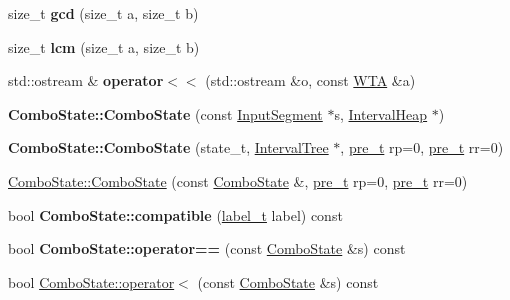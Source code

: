 \begin{DoxyCompactItemize}
size\+\_\+t {\bfseries gcd} (size\+\_\+t a, size\+\_\+t b)
\item 
\mbox{\label{group__schemata_ga21cc98547ba237fc676751c60c220415}} 
size\+\_\+t {\bfseries lcm} (size\+\_\+t a, size\+\_\+t b)
\item 
\mbox{\label{group__schemata_gab750ab8b8fe56baba66c96e38398b632}} 
std\+::ostream \& {\bfseries operator$<$$<$} (std\+::ostream \&o, const \mbox{\hyperlink{classWTA}{W\+TA}} \&a)
\item 
\mbox{\label{group__schemata_gadb95b4bb9322c3e2aba43ef1663a035e}} 
{\bfseries Combo\+State\+::\+Combo\+State} (const \mbox{\hyperlink{classInputSegment}{Input\+Segment}} $\ast$s, \mbox{\hyperlink{classIntervalHeap}{Interval\+Heap}} $\ast$)
\item 
\mbox{\label{group__schemata_gaffac6cd8adcfb6bbb0cd9fc601d9a2e1}} 
{\bfseries Combo\+State\+::\+Combo\+State} (state\+\_\+t, \mbox{\hyperlink{classIntervalTree}{Interval\+Tree}} $\ast$, \mbox{\hyperlink{group__general_ga092fe8b972dfa977c2a0886720a7731e}{pre\+\_\+t}} rp=0, \mbox{\hyperlink{group__general_ga092fe8b972dfa977c2a0886720a7731e}{pre\+\_\+t}} rr=0)
\item 
\mbox{\hyperlink{group__schemata_gad80378e34fdc145bd7f0dac17c306e39}{Combo\+State\+::\+Combo\+State}} (const \mbox{\hyperlink{classComboState}{Combo\+State}} \&, \mbox{\hyperlink{group__general_ga092fe8b972dfa977c2a0886720a7731e}{pre\+\_\+t}} rp=0, \mbox{\hyperlink{group__general_ga092fe8b972dfa977c2a0886720a7731e}{pre\+\_\+t}} rr=0)
\item 
\mbox{\label{group__schemata_ga946acbddc843e4ade0b1f47bca5b0929}} 
bool {\bfseries Combo\+State\+::compatible} (\mbox{\hyperlink{group__output_ga22fde970e635fcf63962743b2d5c441d}{label\+\_\+t}} label) const
\item 
\mbox{\label{group__schemata_ga66c814d1c1c9f1a90c5fc3a1a9d89395}} 
bool {\bfseries Combo\+State\+::operator==} (const \mbox{\hyperlink{classComboState}{Combo\+State}} \&s) const
\item 
\mbox{\label{group__schemata_ga505e9ff93681bbfe5632a15708facb63}} 
bool \mbox{\hyperlink{group__schemata_ga505e9ff93681bbfe5632a15708facb63}{Combo\+State\+::operator$<$}} (const \mbox{\hyperlink{classComboState}{Combo\+State}} \&s) const

\end{DoxyCompactItemize}
